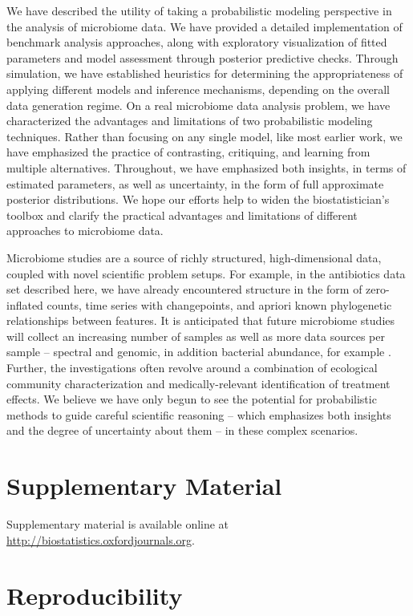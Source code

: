 \documentclass[oupdraft]{bio}
\begin{document}
We have described the utility of taking a probabilistic modeling perspective in
the analysis of microbiome data. We have provided a detailed implementation of
benchmark analysis approaches, along with exploratory visualization of fitted
parameters and model assessment through posterior predictive checks. Through
simulation, we have established heuristics for determining the appropriateness
of applying different models and inference mechanisms, depending on the overall
data generation regime. On a real microbiome data analysis problem, we have
characterized the advantages and limitations of two probabilistic modeling
techniques. Rather than focusing on any single model, like most earlier work, we
have emphasized the practice of contrasting, critiquing, and learning from
multiple alternatives. Throughout, we have emphasized both insights, in terms of
estimated parameters, as well as uncertainty, in the form of full approximate
posterior distributions. We hope our efforts help to widen the biostatistician's
toolbox and clarify the practical advantages and limitations of different
approaches to microbiome data.

Microbiome studies are a source of richly structured, high-dimensional data,
coupled with novel scientific problem setups. For example, in the antibiotics
data set described here, we have already encountered structure in the form of
zero-inflated counts, time series with changepoints, and apriori known
phylogenetic relationships between features. It is anticipated that future
microbiome studies will collect an increasing number of samples as well as more
data sources per sample -- spectral and genomic, in addition bacterial
abundance, for example \citep{jansson2016multi}. Further, the investigations
often revolve around a combination of ecological community characterization and
medically-relevant identification of treatment effects. We believe we have only
begun to see the potential for probabilistic methods to guide careful scientific
reasoning -- which emphasizes both insights and the degree of uncertainty about
them -- in these complex scenarios.

\section{Supplementary Material}

Supplementary material is available online at
\url{http://biostatistics.oxfordjournals.org}.

\section{Reproducibility}
\end{document}
